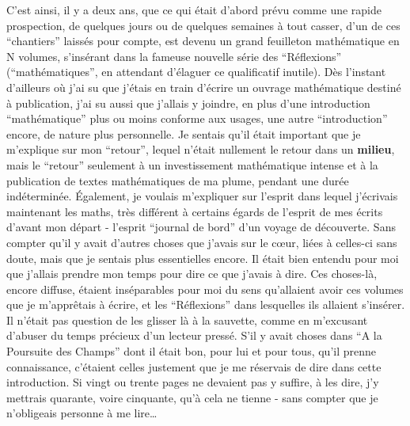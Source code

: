 C'est ainsi, il y a deux ans, que ce qui était d'abord prévu comme une rapide prospection, de quelques jours ou de quelques semaines à tout casser, d'un de ces ``chantiers'' laissés pour compte, est devenu un grand feuilleton mathématique en N volumes, s'insérant dans la fameuse nouvelle série des ``Réflexions'' (``mathématiques'', en attendant d'élaguer ce qualificatif inutile). Dès l'instant d'ailleurs où j'ai su que j'étais en train d'écrire un ouvrage mathématique destiné à publication, j'ai su aussi que j'allais y joindre, en plus d'une introduction ``mathématique'' plus ou moins conforme aux usages, une autre ``introduction'' encore, de nature plus personnelle. Je sentais qu'il était important que je m'explique sur mon ``retour'', lequel n'était nullement le retour dans un \textbf{milieu}, mais le ``retour'' seulement à un investissement mathématique intense et à la publication de textes mathématiques de ma plume, pendant une durée indéterminée. Également, je voulais m'expliquer sur l'esprit dans lequel j'écrivais maintenant les maths, très différent à certains égards de l'esprit de mes écrits d'avant mon départ - l'esprit ``journal de bord'' d'un voyage de découverte. Sans compter qu'il y avait d'autres choses que j'avais sur le cœur, liées à celles-ci sans doute, mais que je sentais plus essentielles encore. Il était bien entendu pour moi que j'allais prendre mon temps pour dire ce que j'avais à dire. Ces choses-là, encore diffuse, étaient inséparables pour moi du sens qu'allaient avoir ces volumes que je m'apprêtais à écrire, et les ``Réflexions'' dans lesquelles ils allaient s'insérer. Il n'était pas question de les glisser là à la sauvette, comme en m'excusant d'abuser du temps précieux d'un lecteur pressé. S'il y avait choses dans ``A la Poursuite des Champs'' dont il était bon, pour lui et pour tous, qu'il prenne connaissance, c'étaient celles justement que je me réservais de dire dans cette introduction. Si vingt ou trente pages ne devaient pas y suffire, à les dire, j'y mettrais quarante, voire cinquante, qu'à cela ne tienne - sans compter que je n'obligeais personne à me lire\ldots

